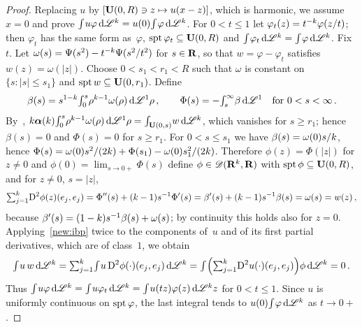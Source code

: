 \begin{proof}
    Replacing $u$ by $[\mathbf{U}(0,R) \ni z \mapsto u(x - z)]$, which is harmonic, we assume $x = 0$
    and prove ${\textstyle\int_{}^{}} u \varphi \,\mathrm{d} \mathscr{L}^{k} = u(0) {\textstyle\int_{}^{}} \varphi \,\mathrm{d} \mathscr{L}^{k}$.
    For $0 < t \le 1$ let $\varphi_t(z) = t^{-k} \varphi(z/t)$; then $\varphi_t$ has the same
    form as~$\varphi$, $\operatorname{spt} \varphi_t \subseteq \mathbf{U}(0,R)$ and ${\textstyle\int_{}^{}} \varphi_t \,\mathrm{d}
    \mathscr{L}^{k} = {\textstyle\int_{}^{}} \varphi \,\mathrm{d} \mathscr{L}^{k}$. Fix~$t$. Let $\omega(s) = \Psi(s^2) -
    t^{-k} \Psi(s^2/t^2)$ for $s \in \mathbf{R}$, so that $w = \varphi - \varphi_t$ satisfies $w(z) =
    \omega(|z|)$. Choose $0 < s_1 < r_1 < R$ such that $\omega$ is constant on $\{ s : |s| \le s_1
    \}$ and $\operatorname{spt} w \subseteq \mathbf{U}(0,r_1)$. Define
    \begin{displaymath}
        \beta(s) = s^{1-k} {\textstyle\int_{0}^{s}} \rho^{k-1} \omega(\rho) \,\mathrm{d} \mathscr{L}^1 \rho \,, \qquad
        \Phi(s) = - {\textstyle\int_{s}^{\infty}} \beta \,\mathrm{d} \mathscr{L}^1 \quad \text{for $0 < s < \infty$} \,.
    \end{displaymath}
    By~\cite[3.2.13]{Federer1969}, $k \boldsymbol{\alpha}(k) {\textstyle\int_{0}^{s}} \rho^{k-1}
    \omega(\rho) \,\mathrm{d} \mathscr{L}^1 \rho = {\textstyle\int_{\mathbf{U}(0,s)}^{}} w \,\mathrm{d} \mathscr{L}^{k}$, which vanishes for $s
    \ge r_1$; hence $\beta(s) = 0$ and $\Phi(s) = 0$ for $s \ge r_1$. For $0 < s \le s_1$ we have
    $\beta(s) = \omega(0) s/k$, hence $\Phi(s) = \omega(0) s^2/(2 k) + \Phi(s_1) -
    \omega(0) s_1^2/(2k)$. Therefore $\phi(z) = \Phi(|z|)$ for $z \ne 0$ and $\phi(0) =
    \lim_{s \to 0+} \Phi(s)$ define $\phi \in \mathscr{D}(\mathbf{R}^{k},\mathbf{R})$ with $\operatorname{spt} \phi \subseteq
    \mathbf{U}(0,R)$, and for $z \ne 0$, $s = |z|$,
    \begin{displaymath}
        {\textstyle\sum_{j=1}^{k}} \mathrm{D}^2 \phi(z)(e_j,e_j) = \Phi''(s) + (k - 1) s^{-1} \Phi'(s) =
        \beta'(s) + (k - 1) s^{-1} \beta(s) = \omega(s) = w(z) \,,
    \end{displaymath}
    because $\beta'(s) = (1 - k) s^{-1} \beta(s) + \omega(s)$; by continuity this holds also for
    $z = 0$. Applying~\ref{new:ibp} twice to the components of~$u$ and of its first partial
    derivatives, which are of class~$1$, we obtain
    \begin{displaymath}
        {\textstyle\int_{}^{}} u \, w \,\mathrm{d} \mathscr{L}^{k} = {\textstyle\sum_{j=1}^{k}} {\textstyle\int_{}^{}} u \, \mathrm{D}^2 \phi(\cdot)
        (e_j,e_j) \,\mathrm{d} \mathscr{L}^{k} = {\textstyle\int_{}^{}} \Big( {\textstyle\sum_{j=1}^{k}} \mathrm{D}^2 u(\cdot)(e_j,e_j)
        \Big) \phi \,\mathrm{d} \mathscr{L}^{k} = 0 \,.
    \end{displaymath}
    Thus ${\textstyle\int_{}^{}} u \varphi \,\mathrm{d} \mathscr{L}^{k} = {\textstyle\int_{}^{}} u \varphi_t \,\mathrm{d} \mathscr{L}^{k} =
    {\textstyle\int_{}^{}} u(t z) \varphi(z) \,\mathrm{d} \mathscr{L}^{k} z$ for $0 < t \le 1$. Since $u$ is uniformly
    continuous on $\operatorname{spt} \varphi$, the last integral tends to $u(0) {\textstyle\int_{}^{}} \varphi \,\mathrm{d}
    \mathscr{L}^{k}$ as $t \to 0+$.
\end{proof}

